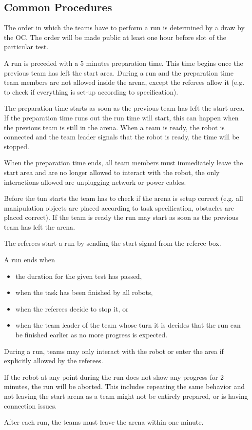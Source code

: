 \subsection{Common Procedures} 
The order in which the teams have to perform a run is determined by a draw by the OC. The order will be made public at least one hour before slot of the particular test.
\par
A run is preceded with a 5 minutes preparation time. This time begins once the previous team has left the start area.
During a run and the preparation time team members are not allowed inside the arena, except the referees allow it (e.g. to check if everything is set-up according to specification).
\par
The preparation time starts as soon as the previous team has left the start area. If the preparation time runs out the run time will start, this can happen when the previous team is still in the arena. When a team is ready, the robot is connected and the team leader signals that the robot is ready, the time will be stopped. 
\par
When the preparation time ends, all team members must immediately leave the start area and are no longer allowed to interact with the robot, the only interactions allowed are unplugging network or power cables.

\par 
Before the tun starts the team has to check if the arena is setup correct (e.g. all manipulation objects are placed according to task specification, obstacles are placed correct). If the team is ready the run may start as soon as the previous team has left the arena.
\par 


The referees start a run by sending the start signal from the referee box.
\par
A run ends when 
\begin{itemize}
	\item the duration for the given test has passed,
	\item when the task has been finished by all robots,
	\item when the referees decide to stop it, or 
	\item when the team leader of the team whose turn it is decides that the run can be finished earlier as no more progress is expected.
\end{itemize}
\par
During a run, teams may only interact with the robot or enter the area if explicitly allowed by the referees.
\par
If the robot at any point during the run does not show any progress for 2 minutes, the run will be aborted. This includes repeating the same behavior and not leaving the start arena as a team might not be entirely prepared, or is having connection issues.
\par
After each run, the teams must leave the arena within one minute.

